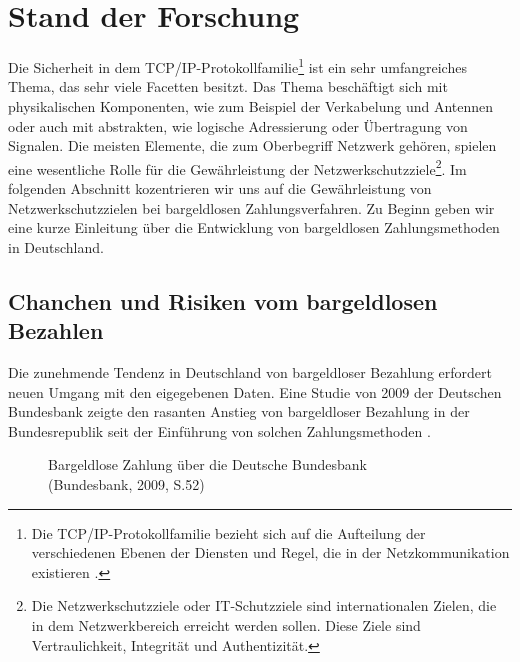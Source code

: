 \section{Stand der Forschung}

Die Sicherheit in dem TCP/IP-Protokollfamilie\footnote{Die TCP/IP-Protokollfamilie bezieht sich auf die Aufteilung 
der verschiedenen Ebenen der Diensten und Regel, die in der Netzkommunikation existieren \cite{refbook:SWIS}.} ist 
ein sehr umfangreiches Thema, das sehr viele Facetten besitzt. Das Thema beschäftigt sich mit physikalischen 
Komponenten, wie zum Beispiel der Verkabelung und Antennen oder auch mit abstrakten, wie logische Adressierung oder 
Übertragung von Signalen. Die meisten Elemente, die zum Oberbegriff Netzwerk gehören, spielen eine wesentliche Rolle 
für die Gewährleistung der Netzwerkschutzziele\footnote{Die Netzwerkschutzziele oder IT-Schutzziele sind internationalen
Zielen, die in dem Netzwerkbereich erreicht werden sollen. Diese Ziele sind Vertraulichkeit, Integrität und 
Authentizität.}. Im folgenden Abschnitt kozentrieren wir uns auf die Gewährleistung von Netzwerkschutzzielen
bei bargeldlosen Zahlungsverfahren. Zu Beginn geben wir eine kurze Einleitung über die Entwicklung von bargeldlosen
Zahlungsmethoden in Deutschland.


\subsection{Chanchen und Risiken vom bargeldlosen Bezahlen}

Die zunehmende Tendenz in Deutschland von bargeldloser Bezahlung erfordert neuen Umgang mit den eigegebenen Daten. 
Eine Studie von 2009 der Deutschen Bundesbank zeigte den rasanten Anstieg von bargeldloser Bezahlung in der
Bundesrepublik seit der Einführung von solchen Zahlungsmethoden \cite{refrep:DBCP}.

\begin{figure}[H]
    \caption{Bargeldlose Zahlung über die Deutsche Bundesbank\\ (Bundesbank, 2009, S.52)}
    \label{fig:refrep_DB}
\end{figure}


